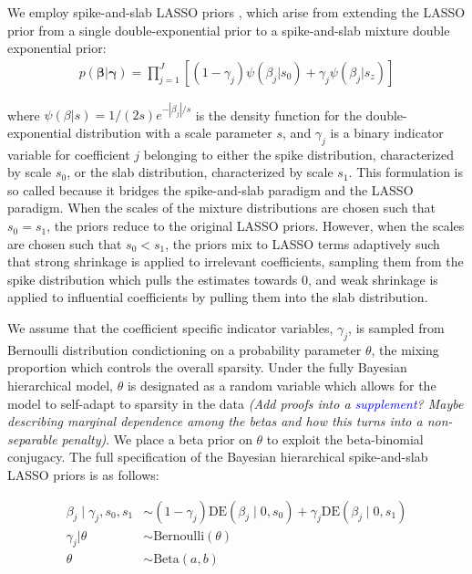 \documentclass[11pt,a4paper]{article}
\let\cite\parencite
\begin{document}
We employ spike-and-slab LASSO priors \cite{RockovaGeorge2018}, which arise from extending the LASSO prior from a single double-exponential prior to a spike-and-slab mixture double exponential prior:
\begin{align*}
p(\boldsymbol{\beta}|\boldsymbol{\gamma})= \prod_{j=1}^J[(1-\gamma_j)\psi(\beta_j|s_0) + \gamma_j\psi(\beta_j|s_z)]
\end{align*}

\noindent
where $\psi(\beta|s) = 1/(2s)e^{-|\beta_j|/s}$ is the density function for the double-exponential distribution with a scale parameter $s$, and $\gamma_j$ is a binary indicator variable for coefficient $j$ belonging to either the spike distribution, characterized by scale $s_0$, or the slab distribution, characterized by scale $s_1$. This formulation is so called because it bridges the spike-and-slab paradigm and the LASSO paradigm. When the scales of the mixture distributions are chosen such that $s_0=s_1$, the priors reduce to the original LASSO priors. However, when the scales are chosen such that $s_0 < s_1$, the priors mix to LASSO terms adaptively such that strong shrinkage is applied to irrelevant coefficients, sampling them from the spike distribution which pulls the estimates towards $0$, and weak shrinkage is applied to influential coefficients by pulling them into the slab distribution.

We assume that the coefficient specific indicator variables, $\gamma_j$, is sampled from Bernoulli distribution condictioning on a probability parameter $\theta$, the mixing proportion which controls the overall sparsity. Under the fully Bayesian hierarchical model, $\theta$ is designated as a random variable which allows for the model to self-adapt to sparsity in the data \cite{RockovaGeorge2018, Castillo2012} \textit{(Add proofs into a \textcolor{blue}{supplement}? Maybe describing marginal dependence among the betas and how this turns into a non-separable penalty)}. We place a beta prior on $\theta$ to exploit the beta-binomial conjugacy. The full specification of the Bayesian hierarchical spike-and-slab LASSO priors is as follows:

\begin{align*}
    \beta_j \mid \gamma_j, s_0, s_1 &\sim (1 - \gamma_j)\text{DE}(\beta_j \mid 0, s_0) + \gamma_j\text{DE}(\beta_j \mid 0, s_1) \\
    \gamma_j| \theta &\sim \text{Bernoulli}(\theta) \\
    \theta &\sim \text{Beta}(a,b)
\end{align*}
\end{document}
